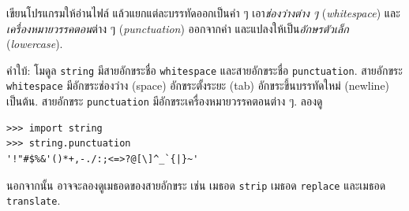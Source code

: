 \begin{exercise}


เขียนโปรแกรมให้อ่านไฟล์ แล้วแยกแต่ละบรรทัดออกเป็นคำ ๆ 
เอา\textit{ช่องว่างต่าง ๆ} (\textit{whitespace}) และ\textit{เครื่องหมายวรรคตอน}ต่าง ๆ (\textit{punctuation}) ออกจากคำ
และแปลงให้เป็น\textit{อักษรตัวเล็ก} (\textit{lowercase}).



คำใบ้: โมดูล \texttt{string} มีสายอักขระชื่อ \texttt{whitespace}
และสายอักขระชื่อ \texttt{punctuation}.
สายอักขระ \texttt{whitespace} มีอักขระช่องว่าง (space) อักขระตั้งระยะ (tab) อักขระขึ้นบรรทัดใหม่ (newline) เป็นต้น.
สายอักขระ \texttt{punctuation}  มีอักขระเครื่องหมายวรรคตอนต่าง ๆ.
ลองดู %

\begin{verbatim}
>>> import string
>>> string.punctuation
'!"#$%&'()*+,-./:;<=>?@[\]^_`{|}~'
\end{verbatim}
%
%
นอกจากนั้น อาจจะลองดูเมธอดของสายอักขระ เช่น เมธอด \texttt{strip} เมธอด \texttt{replace} และเมธอด \texttt{translate}.
%
\\
\end{exercise}


